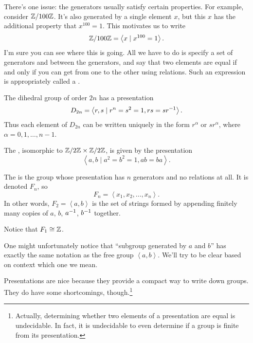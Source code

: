 There's one issue: the generators usually satisfy certain properties.
For example, consider $\mathbb Z/100\mathbb Z$.
It's also generated by a single element $x$,
but this $x$ has the additional property that $x^{100} = 1$.
This motivates us to write
\[ \mathbb Z/100\mathbb Z = \left< x \mid x^{100} = 1 \right>. \]
I'm sure you can see where this is going.
All we have to do is specify a set of generators and
 between the generators,
and say that two elements are equal if and only if
you can get from one to the other using relations.
Such an expression is appropriately called a .

\begin{example}
	The dihedral group of order $2n$ has a presentation
	\[ D_{2n} = \left< r, s
		\mid r^n = s^2 = 1, rs = sr^{-1} \right>. \]
	Thus each element of $D_{2n}$ can be written uniquely in the form $r^\alpha$
	or $sr^\alpha$, where $\alpha = 0, 1, \dots, n-1$.
\end{example}

\begin{example}
	The ,
	isomorphic to $\mathbb Z/2\mathbb Z \times \mathbb Z/2\mathbb Z$, is given by the presentation
	\[ \left< a,b \mid a^2=b^2=1, ab=ba \right>. \]
\end{example}

\begin{example}
	The  is the group
	whose presentation has $n$ generators and no relations at all.
	It is denoted $F_n$, so
	\[
		F_n = \left< x_1, x_2, \dots, x_n \right>.
	\]
	In other words, $F_2 = \left<a,b\right>$ is the set of strings
	formed by appending finitely many copies of $a$, $b$, $a^{-1}$, $b^{-1}$ together.
\end{example}
\begin{ques}
	Notice that $F_1 \cong \mathbb Z$.
\end{ques}
\begin{abuse}
	One might unfortunately notice that ``subgroup generated by $a$ and $b$''
	has exactly the same notation as the free group $\left<a,b\right>$.
	We'll try to be clear based on context which one we mean.
\end{abuse}

Presentations are nice because they provide a compact way to write down groups.
They do have some shortcomings, though.\footnote{%
Actually, determining whether two elements of a presentation are equal is undecidable.
In fact, it is undecidable to even determine if a group is finite from its presentation.}

